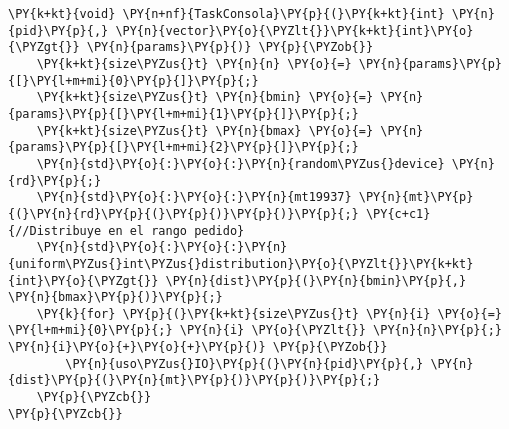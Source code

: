 \begin{Verbatim}[commandchars=\\\{\}]
\PY{k+kt}{void} \PY{n+nf}{TaskConsola}\PY{p}{(}\PY{k+kt}{int} \PY{n}{pid}\PY{p}{,} \PY{n}{vector}\PY{o}{\PYZlt{}}\PY{k+kt}{int}\PY{o}{\PYZgt{}} \PY{n}{params}\PY{p}{)} \PY{p}{\PYZob{}}
    \PY{k+kt}{size\PYZus{}t} \PY{n}{n} \PY{o}{=} \PY{n}{params}\PY{p}{[}\PY{l+m+mi}{0}\PY{p}{]}\PY{p}{;}
    \PY{k+kt}{size\PYZus{}t} \PY{n}{bmin} \PY{o}{=} \PY{n}{params}\PY{p}{[}\PY{l+m+mi}{1}\PY{p}{]}\PY{p}{;}
    \PY{k+kt}{size\PYZus{}t} \PY{n}{bmax} \PY{o}{=} \PY{n}{params}\PY{p}{[}\PY{l+m+mi}{2}\PY{p}{]}\PY{p}{;}
    \PY{n}{std}\PY{o}{:}\PY{o}{:}\PY{n}{random\PYZus{}device} \PY{n}{rd}\PY{p}{;}
    \PY{n}{std}\PY{o}{:}\PY{o}{:}\PY{n}{mt19937} \PY{n}{mt}\PY{p}{(}\PY{n}{rd}\PY{p}{(}\PY{p}{)}\PY{p}{)}\PY{p}{;} \PY{c+c1}{//Distribuye en el rango pedido}
    \PY{n}{std}\PY{o}{:}\PY{o}{:}\PY{n}{uniform\PYZus{}int\PYZus{}distribution}\PY{o}{\PYZlt{}}\PY{k+kt}{int}\PY{o}{\PYZgt{}} \PY{n}{dist}\PY{p}{(}\PY{n}{bmin}\PY{p}{,} \PY{n}{bmax}\PY{p}{)}\PY{p}{;}
    \PY{k}{for} \PY{p}{(}\PY{k+kt}{size\PYZus{}t} \PY{n}{i} \PY{o}{=} \PY{l+m+mi}{0}\PY{p}{;} \PY{n}{i} \PY{o}{\PYZlt{}} \PY{n}{n}\PY{p}{;} \PY{n}{i}\PY{o}{+}\PY{o}{+}\PY{p}{)} \PY{p}{\PYZob{}}
        \PY{n}{uso\PYZus{}IO}\PY{p}{(}\PY{n}{pid}\PY{p}{,} \PY{n}{dist}\PY{p}{(}\PY{n}{mt}\PY{p}{)}\PY{p}{)}\PY{p}{;}
    \PY{p}{\PYZcb{}}
\PY{p}{\PYZcb{}}
\end{Verbatim}